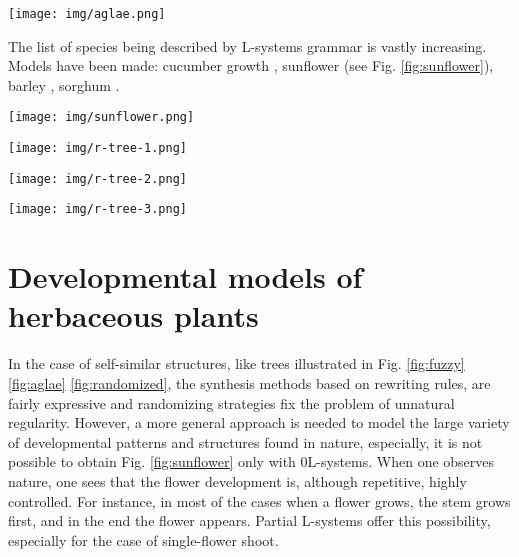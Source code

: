 \documentclass[10pt, letterpaper, twoside]{article}
\newenvironment{Figure}
  {\par\medskip\noindent\minipage{\linewidth}}
  {\endminipage\par\medskip}
\begin{document}
\begin{multicols}{2}
\begin{Figure}
    \centering
    \texttt{[image: img/aglae.png]}
    \label{fig:aglae}
\end{Figure}

The list of species being described by L-systems grammar is vastly increasing.
Models have been made: cucumber growth \cite{cucumber}, sunflower \cite{TheAB}
(see Fig. \ref{fig:sunflower}), barley \cite{barley}, sorghum \cite{sorghum}.

\begin{Figure}
    \centering
    \texttt{[image: img/sunflower.png]}
    \label{fig:sunflower}
\end{Figure}

\begin{Figure}
    \centering
    \begin{minipage}{.3\textwidth}
      \centering
      \texttt{[image: img/r-tree-1.png]}
    \end{minipage}%
    \begin{minipage}{.3\textwidth}
      \centering
      \texttt{[image: img/r-tree-2.png]}
    \end{minipage}
    \begin{minipage}{.3\textwidth}
        \centering
        \texttt{[image: img/r-tree-3.png]}
    \end{minipage}

    \label{fig:randomized}
\end{Figure}

\section*{Developmental models of herbaceous plants}
In the case of self-similar structures, like trees illustrated in Fig.
\ref{fig:fuzzy} \ref{fig:aglae} \ref{fig:randomized}, the synthesis methods
based on rewriting rules, are fairly expressive and randomizing strategies fix
the problem of unnatural regularity. However, a more general approach is needed
to model the large variety of developmental patterns and structures found in
nature, especially, it is not possible to obtain Fig. \ref{fig:sunflower} only
with 0L-systems. When one observes nature, one sees that the flower development
is, although repetitive, highly controlled. For instance, in most of the cases
when a flower grows, the stem grows first, and in the end the flower appears.
Partial L-systems offer this possibility, especially for the case of
single-flower shoot.


\end{multicols}
\end{document}
